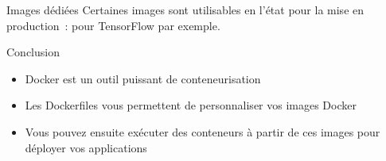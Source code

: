 \begin{frame}{Images dédiées}
  Certaines images sont utilisables en l'état pour la mise en production~:  pour TensorFlow par exemple.
\end{frame}

\begin{frame}{Conclusion}
  \begin{itemize}
    \item Docker est un outil puissant de conteneurisation
    \item Les Dockerfiles vous permettent de personnaliser vos images Docker
    \item Vous pouvez ensuite exécuter des conteneurs à partir de ces images pour déployer vos applications
  \end{itemize}
\end{frame}
